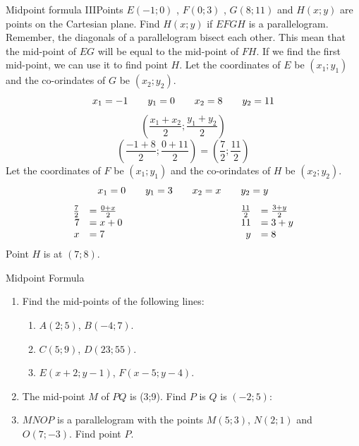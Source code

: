 \begin{wex}{Midpoint formula III}{Points $E(-1;0)$ , $F(0;3)$ , $G(8;11)$ and $H(x;y)$ are points on the Cartesian plane. Find $H(x;y)$ if $EFGH$ is a parallelogram.}{
Remember, the diagonals of a parallelogram bisect each other. This mean that the mid-point of $EG$
will be equal to the mid-point of $FH$. If we find the first mid-point, we can use it to find point $H$.
Let the coordinates of $E$ be $(x_1;y_1)$ and the co-orindates of $G$ be $(x_2;y_2)$.
\begin{equation*}
x_1=-1 \hskip2em y_1=0 \hskip2em x_2=8 \hskip2em y_2=11
\end{equation*}
\begin{equation*}
(\frac{x_1+x_2}{2}; \frac{y_1+y_2}{2})
\end{equation*}
\begin{equation*}
(\frac{-1+8}{2}; \frac{0+11}{2}) = (\frac{7}{2};\frac{11}{2})
\end{equation*}
Let the coordinates of $F$ be $(x_1;y_1)$ and the co-orindates of $H$ be $(x_2;y_2)$.
\begin{equation*}
x_1=0 \hskip2em y_1=3 \hskip2em x_2=x \hskip2em y_2=y
\end{equation*}
\begin{equation*}
\begin{array}{rllrl}
\frac{7}{2}&=\frac{0+x}{2}&\hskip10em&\frac{11}{2}&=\frac{3+y}{2}\\
7&=x+0&&11&=3+y\\
x&=7&&y&=8\\
\end{array}
\end{equation*}
Point $H$ is at $(7;8)$.
}
\end{wex}

\begin{exercises}{Midpoint Formula}
\begin{enumerate}
\item Find the mid-points of the following lines:
\begin{enumerate}
\item $A(2;5)$, $B(-4;7)$.
\item $C(5;9)$, $D(23;55)$.
\item $E(x+2;y-1)$, $F(x-5;y-4)$.
\end{enumerate}

\item The mid-point $M$ of $PQ$ is (3;9). Find $P$ is $Q$ is $(-2;5)$:

\item $MNOP$ is a parallelogram with the points $M(5;3)$, $N(2;1)$ and $O(7;-3)$. Find point $P$.
\end{enumerate}
\end{exercises}    

